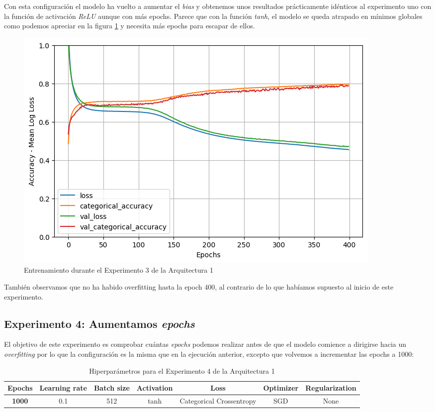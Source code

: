 \documentclass{article}
\begin{document}
			Con esta configuraci\'on el modelo ha vuelto a aumentar el \textit{bias} y obtenemos unos resultados pr\'acticamente id\'enticos al experimento uno con la funci\'on de activaci\'on \textit{ReLU} aunque con m\'as epochs. Parece que con la funci\'on \textit{tanh}, el modelo se queda atrapado en m\'inimos globales como podemos apreciar en la figura \ref{tr-a1-e3} y necesita m\'as epochs para escapar de ellos.\\
			
			\begin{figure}[!h]
				\begin{center}
					\includegraphics[scale=0.5]{tr-a1-e3.png}		
					\caption{Entrenamiento durante el Experimento 3 de la Arquitectura 1}	
					\label{tr-a1-e3}
				\end{center}
			\end{figure}
			
			Tambi\'en observamos que no ha habido overfitting hasta la epoch 400, al contrario de lo que hab\'iamos supuesto al inicio de este experimento.
			
		\subsection{Experimento 4: Aumentamos \textit{epochs}}
		\label{s-a1-e4}
			El objetivo de este experimento es comprobar cu\'antas \textit{epochs} podemos realizar antes de que el modelo comience a dirigirse hacia un \textit{overfitting} por lo que la configuraci\'on es la misma que en la ejecuci\'on anterior, excepto que volvemos a incrementar las epochs a 1000:
			\begin{table}[!h]
				\begin{center}
					\begin{tabular}{| c | c | c | c | c | c | c |}
						\textbf{Epochs} & \textbf{Learning rate} & \textbf{Batch size} & \textbf{Activation} & \textbf{Loss} & \textbf{Optimizer} & \textbf{Regularization} \\ \hline
						\textbf{1000} & 0.1 & 512 & tanh & Categorical Crossentropy & SGD & None
					\end{tabular}
					\caption{Hiperpar\'ametros para el Experimento 4 de la Arquitectura 1}
					\label{tab:hip-a1-e4}
				\end{center}
			\end{table}
			
\end{document}
